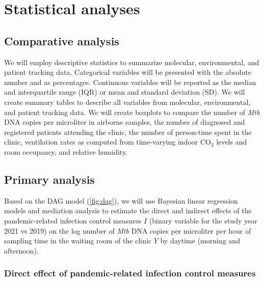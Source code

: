 \documentclass{article}
\begin{document}
\section{Statistical analyses}

\subsection{Comparative analysis}

We will employ descriptive statistics to summarize molecular, environmental, and patient tracking data. Categorical variables will be presented with the absolute number and as percentages. Continuous variables will be reported as the median and interquartile range (IQR) or mean and standard deviation (SD). We will create summary tables to describe all variables from molecular, environmental, and patient tracking data. We will create boxplots to compare the number of \emph{Mtb} DNA copies per microliter in airborne samples, the number of diagnosed and registered patients attending the clinic, the number of person-time spent in the clinic, ventilation rates as computed from time-varying indoor CO$_2$ levels and room occupancy, and relative humidity.

\subsection{Primary analysis}

Based on the DAG model (\cref{fig:dag}), we will use Bayesian linear regression models and mediation analysis to estimate the direct and indirect effects of the pandemic-related infection control measures $I$ (binary variable for the study year 2021 vs 2019) on the log number of \emph{Mtb} DNA copies per microliter per hour of sampling time in the waiting room of the clinic $Y$ by daytime (morning and afternoon). 

\subsubsection*{Direct effect of pandemic-related infection control measures}
\end{document}

